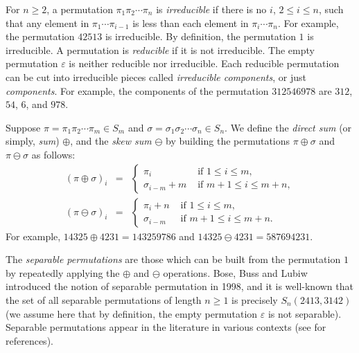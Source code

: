 \documentclass[10pt,a4paper]{article}
\begin{document}
For $n \ge 2$, a permutation $\pi_1 \pi_2 \cdots \pi_n$ is \textit{irreducible} if there is no $i$, 
$2 \le i \le n$, such that any element in $\pi_1 \cdots \pi_{i-1}$ is less than each element in 
$\pi_i \cdots \pi_n$. For example, the permutation $42513$ is irreducible. By definition, the permutation $1$ is irreducible. A permutation is \textit{reducible} if it is not irreducible. The empty permutation $\varepsilon$ is neither reducible nor irreducible. Each reducible permutation can be cut into irreducible pieces called 
\textit{irreducible components}, or just \textit{components}. For example, the components of the permutation $312546978$ are $312$, $54$, $6$, and $978$.

Suppose $\pi=\pi_1\pi_2\cdots\pi_m \in S_m$ and $\sigma=\sigma_1\sigma_2\cdots\sigma_n\in S_n$. We define the {\em direct sum} (or simply, {\em sum}) $\oplus$, and the {\em skew sum} $\ominus$ by building the permutations $\pi\oplus\sigma$ and $\pi\ominus\sigma$ as follows:
\begin{eqnarray*}
(\pi\oplus\sigma)_i&=& \left\{
\begin{array}{ll}
\pi_i  &  \mbox{ if }1\leq i\leq m,\\
\sigma_{i-m}+m & \mbox{ if }m+1\leq i\leq m+n,
\end{array}\right.\nonumber \\
(\pi\ominus\sigma)_i &=& \left\{
\begin{array}{ll}
\pi_i+n  &  \mbox{ if }1\leq i\leq m,\\
\sigma_{i-m} & \mbox{ if }m+1\leq i\leq m+n.
\end{array}\right.\nonumber
\end{eqnarray*}
For example, $14325\oplus 4231=143259786$ and $14325\ominus 4231= 587694231$. 

The {\em separable permutations} are those which can be built from the permutation $1$ by repeatedly applying the $\oplus$ and $\ominus$ operations. Bose, Buss and Lubiw~\cite{BBL98} introduced the notion of separable permutation in 1998, and it is well-known \cite{Kit} that the set of all separable permutations of length $n\geq 1$ is precisely $S_n(2413,3142)$ (we assume here that by definition, the empty permutation $\varepsilon$ is not separable).  Separable permutations appear in the literature in various contexts (see \cite{CKZ2024} for references). 
\end{document}
